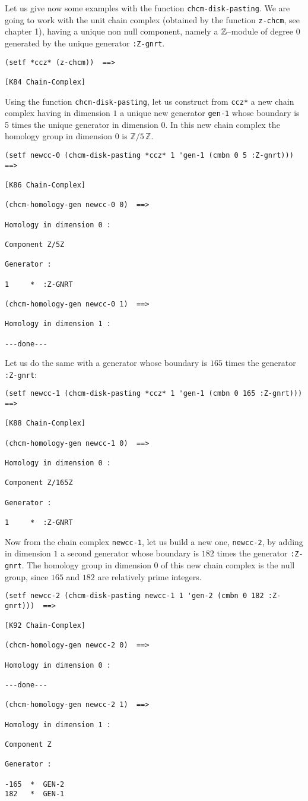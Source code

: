 Let us give now some examples with the function {\tt chcm-disk-pasting}. We are going to work with
the unit chain complex (obtained by the function {\tt z-chcm}, see chapter 1),
having a unique non null component,
namely a ${\mathbb{Z}}$--module of degree $0$ generated by the unique generator {\tt :Z-gnrt}.
{\footnotesize\begin{verbatim}
(setf *ccz* (z-chcm))  ==>

[K84 Chain-Complex]
\end{verbatim}}
Using the function {\tt chcm-disk-pasting}, let us construct from {\tt *ccz*}
a new chain complex  having in dimension $1$ a unique  new generator {\tt gen-1}
whose boundary  is 5 times the unique generator in dimension $0$. In this new chain complex the
homology group in dimension $0$ is  $\mathbb{Z}/5\,\mathbb{Z}$.
{\footnotesize\begin{verbatim}
(setf newcc-0 (chcm-disk-pasting *ccz* 1 'gen-1 (cmbn 0 5 :Z-gnrt)))  ==>

[K86 Chain-Complex]

(chcm-homology-gen newcc-0 0)  ==>

Homology in dimension 0 :

Component Z/5Z

Generator :

1     *  :Z-GNRT

(chcm-homology-gen newcc-0 1)  ==>

Homology in dimension 1 :

---done---
\end{verbatim}}
Let us do the same with a generator whose boundary is  $165$ times the ge\-ne\-ra\-tor {\tt :Z-gnrt}:
{\footnotesize\begin{verbatim}
(setf newcc-1 (chcm-disk-pasting *ccz* 1 'gen-1 (cmbn 0 165 :Z-gnrt))) ==>

[K88 Chain-Complex]

(chcm-homology-gen newcc-1 0)  ==>

Homology in dimension 0 :

Component Z/165Z

Generator :

1     *  :Z-GNRT
\end{verbatim}}
Now from the chain complex {\tt newcc-1}, let us build a new one, {\tt newcc-2},
by adding in dimension $1$ a second generator whose boundary  is $182$ times
the generator {\tt :Z-gnrt}. The homology group in dimension $0$ of this new chain complex
is  the null group, since $165$ and $182$ are relatively prime integers.
{\footnotesize\begin{verbatim}
(setf newcc-2 (chcm-disk-pasting newcc-1 1 'gen-2 (cmbn 0 182 :Z-gnrt)))  ==>

[K92 Chain-Complex]

(chcm-homology-gen newcc-2 0)  ==>

Homology in dimension 0 :

---done---

(chcm-homology-gen newcc-2 1)  ==>

Homology in dimension 1 :

Component Z

Generator :

-165  *  GEN-2
182   *  GEN-1
\end{verbatim}}
